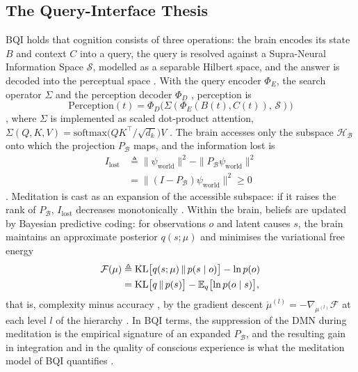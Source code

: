 \subsection{The Query-Interface Thesis}
\label{sec:theory-bqi}
BQI holds that cognition consists of three operations: the brain encodes its state $B$ and context $C$ into a query, the query is resolved against a Supra-Neural Information Space $\mathcal S$, modelled as a separable Hilbert space, and the answer is decoded into the perceptual space \cite[Sec.~3.2]{BQI}. With the query encoder $\Phi_E$, the search operator $\Sigma$ and the perception decoder $\Phi_D$ \cite[eqs.~(10)--(12)]{BQI}, perception is
\begin{equation}
  \mathrm{Perception}(t)=\Phi_D\bigl(\Sigma(\Phi_E(B(t),C(t)),\,\mathcal S)\bigr)
  \label{eq:bqi-perception}
\end{equation}
\cite[eq.~(13)]{BQI}, where $\Sigma$ is implemented as scaled dot-product attention, $\Sigma(Q,K,V)=\mathrm{softmax}\bigl(QK^\top/\sqrt{d_k}\bigr)V$ \cite[Sec.~3.3, eq.~(16)]{BQI}. The brain accesses only the subspace $\mathcal H_{\mathcal B}$ onto which the projection $P_{\mathcal B}$ maps, and the information lost is
\begin{equation}
  \begin{split}
  I_{\mathrm{lost}}&\triangleq\|\psi_{\mathrm{world}}\|^2-\|P_{\mathcal B}\psi_{\mathrm{world}}\|^2\\
  &=\|(I-P_{\mathcal B})\psi_{\mathrm{world}}\|^2\ge 0
  \end{split}
  \label{eq:bqi-loss}
\end{equation}
\cite[eq.~(14)]{BQI}. Meditation is cast as an expansion of the accessible subspace: if it raises the rank of $P_{\mathcal B}$, $I_{\mathrm{lost}}$ decreases monotonically \cite[Corollary~3.1, eq.~(15)]{BQI}. Within the brain, beliefs are updated by Bayesian predictive coding: for observations $o$ and latent causes $s$, the brain maintains an approximate posterior $q(s;\mu)$ and minimises the variational free energy
\begin{equation}
  \begin{split}
  \mathcal F(\mu)&\triangleq\mathrm{KL}\bigl[q(s;\mu)\,\|\,p(s\mid o)\bigr]-\ln p(o)\\
  &=\mathrm{KL}\bigl[q\,\|\,p(s)\bigr]-\mathbb E_q\bigl[\ln p(o\mid s)\bigr],
  \end{split}
  \label{eq:bqi-free-energy}
\end{equation}
that is, complexity minus accuracy \cite[Sec.~3.1, Definition~3.1, eq.~(3)]{BQI}, by the gradient descent $\dot\mu^{(l)}=-\nabla_{\mu^{(l)}}\mathcal F$ at each level $l$ of the hierarchy \cite[eq.~(7)]{BQI}. In BQI terms, the suppression of the DMN during meditation is the empirical signature of an expanded $P_{\mathcal B}$, and the resulting gain in integration and in the quality of conscious experience is what the meditation model of BQI quantifies \cite[Sec.~6.3, 7 and 11.1]{BQI}.

